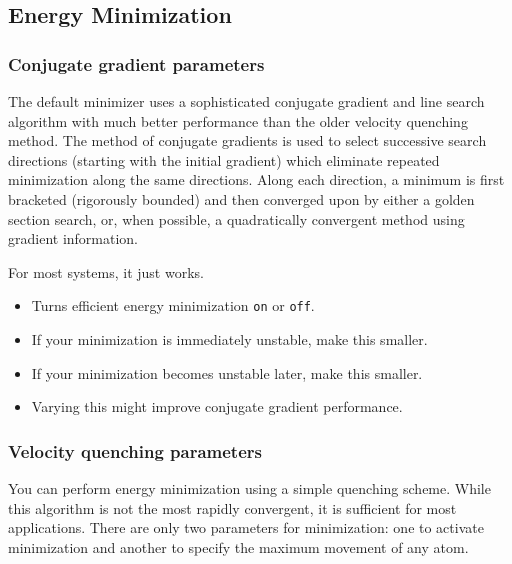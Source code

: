 \subsection{Energy Minimization}

\subsubsection{Conjugate gradient parameters}

The default minimizer uses a sophisticated conjugate gradient and
line search algorithm with much better performance than the older
velocity quenching method.
The method of conjugate gradients is used to select successive search
directions (starting with the initial gradient) which eliminate
repeated minimization along the same directions.
Along each direction, a minimum is first bracketed (rigorously bounded)
and then converged upon by either a golden section search, or, when
possible, a quadratically convergent method using gradient information.

For most systems, it just works.

\begin{itemize}

\item
{}
{Turns efficient energy minimization {\tt on} or {\tt off}.}

\item
{}
{If your minimization is immediately unstable, make this smaller.}

\item
{}
{If your minimization becomes unstable later, make this smaller.}

\item
{}
{Varying this might improve conjugate gradient performance.}

\end{itemize}

\subsubsection{Velocity quenching parameters}

You can perform energy minimization using a simple quenching
scheme.   While this algorithm is not the most rapidly convergent, it
is sufficient for most applications.  There are only two parameters
for minimization:  one to activate minimization and another
to specify the maximum movement of any atom.  

